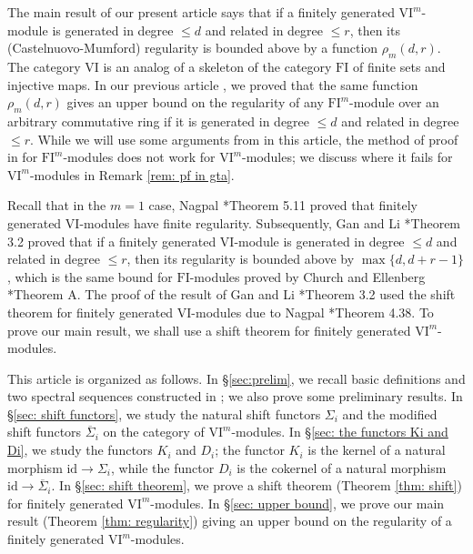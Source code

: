 \documentclass{amsart}
\numberwithin{equation}{section}
\newcommand{\VI}{{\mathrm{VI}}}
\newcommand{\FI}{{\mathrm{FI}}}
\newcommand{\SSigma}{{\overline{\Sigma}}}
\begin{document}
The main result of our present article says that if a finitely generated $\VI^m$-module is generated in degree $\leqslant d$ and related in degree $\leqslant r$, then its (Castelnuovo-Mumford) regularity is bounded above by a function $\rho_m(d,r)$. The category $\VI$ is an analog of a skeleton of the category $\FI$ of finite sets and injective maps. In our previous article \cite{gta}, we proved that the same function $\rho_m(d,r)$ gives an upper bound on the regularity of any $\FI^m$-module over an arbitrary commutative ring if it is generated in degree $\leqslant d$ and related in degree $\leqslant r$. While we will use some arguments from \cite{gta} in this article, the method of proof in \cite{gta} for $\FI^m$-modules does not work for $\VI^m$-modules; we discuss where it fails for $\VI^m$-modules in Remark \ref{rem: pf in gta}. 

Recall that in the $m=1$ case, Nagpal \cite{na}*{Theorem 5.11} proved that finitely generated $\VI$-modules have finite regularity. Subsequently, Gan and Li \cite{gl_vi}*{Theorem 3.2} proved that if a finitely generated $\VI$-module is generated in degree $\leqslant d$ and related in degree $\leqslant r$, then its regularity is bounded above by $\max\{ d, d+r-1 \}$, which is the same bound for $\FI$-modules proved by Church and Ellenberg \cite{ce}*{Theorem A}. The proof of the result of Gan and Li \cite{gl_vi}*{Theorem 3.2} used the shift theorem for finitely generated $\VI$-modules due to Nagpal \cite{na}*{Theorem 4.38}. To prove our main result, we shall use a shift theorem for finitely generated $\VI^m$-modules.

This article is organized as follows. In \S\ref{sec:prelim}, we recall basic definitions and two spectral sequences constructed in \cite{gta}; we also prove some preliminary results.
In \S\ref{sec: shift functors}, we study the natural shift functors $\Sigma_i$ and the modified shift functors $\SSigma_i$ on the category of $\VI^m$-modules. 
In \S\ref{sec: the functors Ki and Di}, we study the functors $K_i$ and $D_i$; the functor $K_i$ is the kernel of a natural morphism $\mathrm{id} \to \Sigma_i$, while the functor $D_i$ is the cokernel of a natural morphism $\mathrm{id} \to \SSigma_i$.
In \S\ref{sec: shift theorem}, we prove a shift theorem (Theorem \ref{thm: shift}) for finitely generated $\VI^m$-modules.
In \S\ref{sec: upper bound}, we prove our main result (Theorem \ref{thm: regularity}) giving an upper bound on the regularity of a finitely generated $\VI^m$-modules. 
\end{document}
